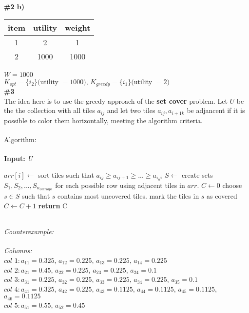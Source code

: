 \documentclass{article}
\begin{document}
\textbf{\#2 b)}\\
\begin{tabular}{|c|c|c| }
 \hline
 item & utility & weight \\
 \hline
 1 & 2 & 1 \\
 \hline
 2 & 1000 & 1000\\
 \hline
\end{tabular}
$W = 1000$
\\$K_{opt} = \{i_2\} ($utility $= 1000)$, $K_{greedy} = \{i_1\} ($utility $= 2)$\\
\textbf{\#3}\\
The idea here is to use the greedy approach of the \textbf{set cover} problem. Let $U$ be the the collection with all tiles $a_{ij}$ and let two tiles $a_{ij}, a_{i+1k}$ be adjancent if it is possible to color them horizontally, meeting the algorithm criteria.\\\\
Algorithm:\\\\
\textbf{Input:} \textit{U}
\begin{algorithmic}
    \State $arr[i] \gets$ sort tiles such that $a_{ij} \geq a_{ij+1} \geq ... \geq a_{i_ni}$
  \EndFor
\EndFor
\State $S \gets$ create sets $S_1, S_2,...,S_{n_{overlaps}}$ for each possible row using adjacent tiles in $arr$.
\State $C \gets 0$
  \State choose $s \in S$ such that $s$ contains most uncovered tiles.
  \State mark the tiles in $s$ as covered
  \State $C \gets C + 1$
\EndWhile
\State \textbf{return} C\\\\
\end{algorithmic}
\textit{Counterexample:}\\
\\\textit{Columns:}\\
$col$ $1 : a_{11} = 0.325$, $a_{12} = 0.225$, $a_{13} = 0.225$, $a_{14} = 0.225$\\ 
$col$ $2 : a_{21} = 0.45$, $a_{22} = 0.225$, $a_{23} = 0.225$, $a_{24} = 0.1$\\
$col$ $3 : a_{31} = 0.225$, $a_{32} = 0.225$, $a_{33} = 0.225$, $a_{34} = 0.225$, $a_{35} = 0.1$\\
$col$ $4 : a_{41} = 0.325$, $a_{42} = 0.225$, $a_{43} = 0.1125$, $a_{44} = 0.1125$, $a_{45} = 0.1125$, $a_{46} = 0.1125$\\
$col$ $5 : a_{51} = 0.55$, $a_{52} = 0.45$\\
\end{document}
